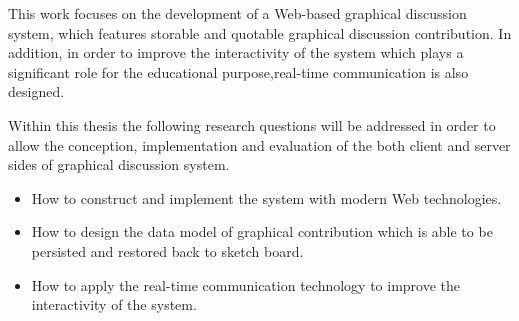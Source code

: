 



This work focuses on the development of a Web-based graphical discussion system, which features storable and quotable graphical discussion contribution. In addition, in order to improve the interactivity of the system which plays a significant role for the educational purpose,real-time communication is also designed. 

Within this thesis the following research questions will be addressed in order to allow the conception, implementation and evaluation of the both client and server sides of graphical discussion system.

\begin{itemize}
  \item How to construct and implement the system with modern Web technologies.
  \item How to design the data model of graphical contribution which is able to be persisted and restored back to sketch board.
  \item How to apply the real-time communication technology to improve the interactivity of the system.
\end{itemize}
